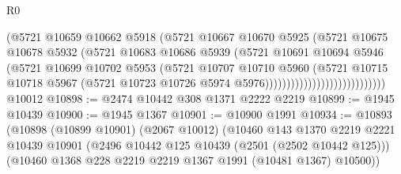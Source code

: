 \begin{lexlean}{R0}
\begin{coremodule}
                                          (@5721
                                            @10659
                                            @10662
                                            @5918
                                            (@5721
                                              @10667
                                              @10670
                                              @5925
                                              (@5721
                                                @10675
                                                @10678
                                                @5932
                                                (@5721
                                                  @10683
                                                  @10686
                                                  @5939
                                                  (@5721
                                                    @10691
                                                    @10694
                                                    @5946
                                                    (@5721
                                                      @10699
                                                      @10702
                                                      @5953
                                                      (@5721
                                                        @10707
                                                        @10710
                                                        @5960
                                                        (@5721
                                                          @10715
                                                          @10718
                                                          @5967
                                                          (@5721
                                                            @10723
                                                            @10726
                                                            @5974
                                                            @5976))))))))))))))))))))))))))))
    @10012
@10898 := @2474 @10442 @308 @1371 @2222 @2219
@10899 := @1945 @10439
@10900 := @1945 @1367
@10901 := @10900 @1991
@10934 := @10893
    (@10898
      (@10899 @10901)
      (@2067 @10012)
      (@10460
        @143
        @1370
        @2219
        @2221
        @10439
        @10901
        (@2496 @10442 @125 @10439 (@2501 (@2502 @10442 @125)))
        (@10460 @1368 @228 @2219 @2219 @1367 @1991 (@10481 @1367) @10500))

\end{coremodule}
\end{lexlean}

